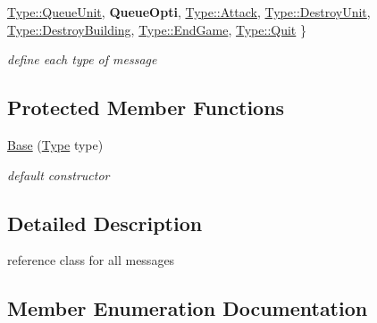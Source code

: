 \begin{DoxyCompactItemize}
\hyperlink{class_network_1_1_messages_1_1_base_a9b516b2b52538f7057771fbd84e05fc4ae1880e17b8745164efdf5fec711dba9a}{Type\+::\+Queue\+Unit}, 
\newline
{\bfseries Queue\+Opti}, 
\hyperlink{class_network_1_1_messages_1_1_base_a9b516b2b52538f7057771fbd84e05fc4adcfafcb4323b102c7e204555d313ba0a}{Type\+::\+Attack}, 
\hyperlink{class_network_1_1_messages_1_1_base_a9b516b2b52538f7057771fbd84e05fc4a68e5a7f6b4e8e7ae3093c440d9a5a8e3}{Type\+::\+Destroy\+Unit}, 
\hyperlink{class_network_1_1_messages_1_1_base_a9b516b2b52538f7057771fbd84e05fc4ad6d262c44ee8adf1a229256b71452063}{Type\+::\+Destroy\+Building}, 
\newline
\hyperlink{class_network_1_1_messages_1_1_base_a9b516b2b52538f7057771fbd84e05fc4af0f29c4900d44c9e32d203ca799163e1}{Type\+::\+End\+Game}, 
\hyperlink{class_network_1_1_messages_1_1_base_a9b516b2b52538f7057771fbd84e05fc4a0d82790b0612935992bd564a17ce37d6}{Type\+::\+Quit}
 \}\begin{DoxyCompactList}\small\item\em define each type of message \end{DoxyCompactList}
\end{DoxyCompactItemize}
\subsection*{Protected Member Functions}
\begin{DoxyCompactItemize}
\item 
\hyperlink{class_network_1_1_messages_1_1_base_a3bb3c9f2296d822d9fe4467060e02f52}{Base} (\hyperlink{class_network_1_1_messages_1_1_base_a9b516b2b52538f7057771fbd84e05fc4}{Type} type)
\begin{DoxyCompactList}\small\item\em default constructor \end{DoxyCompactList}\end{DoxyCompactItemize}


\subsection{Detailed Description}
reference class for all messages 

\subsection{Member Enumeration Documentation}
\mbox{\label{class_network_1_1_messages_1_1_base_a9b516b2b52538f7057771fbd84e05fc4}} 
